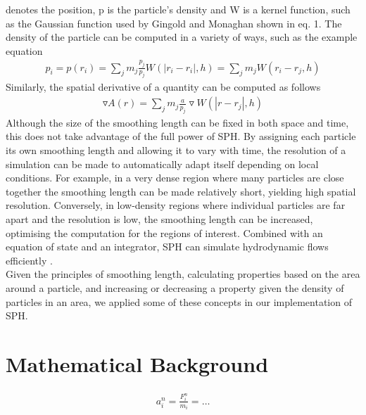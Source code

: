 \documentclass{sigchi}
\begin{document}
denotes the position, p is the particle's density and W is a kernel function, such as the 
Gaussian function used by Gingold and Monaghan shown in eq. 1. The density of 
the particle can be computed in a variety of ways, such as the example equation
\begin{align}
p_i = p(r_i) = \sum_{j} m_j \frac{p_j}{p_j} W (|r_i - r_i|,h) = \sum_{j} m_j W(r_i - r_j,h)
\end{align}
Similarly, the spatial derivative of a quantity can be computed as follows
\begin{align}
\triangledown A(r) = \sum_{j} m_j \frac{a}{p_j} \triangledown W(|r - r_j|, h)
\end{align}
Although the size of the smoothing length can be fixed in both space and time, this does 
not take advantage of the full power of SPH. By assigning each particle its own smoothing 
length and allowing it to vary with time, the resolution of a simulation can be made to 
automatically adapt itself depending on local conditions. For example, in a very dense 
region where many particles are close together the smoothing length can be made relatively 
short, yielding high spatial resolution. Conversely, in low-density regions where 
individual particles are far apart and the resolution is low, the smoothing length can be 
increased, optimising the computation for the regions of interest. Combined with an 
equation of state and an integrator, SPH can simulate hydrodynamic flows efficiently \cite{wikiarticle}.
\\
\hspace*{6 pt} Given the principles of smoothing length, calculating properties based on 
the area around a particle, and increasing or decreasing a property given the density of 
particles in an area, we applied some of these concepts in our implementation of SPH.
%

\section{Mathematical Background}
%
\begin{align}
	a_i^n = \frac{F_i^n}{m_i} = \dots
	\label{math:acceleration}
\end{align}
\end{document}
